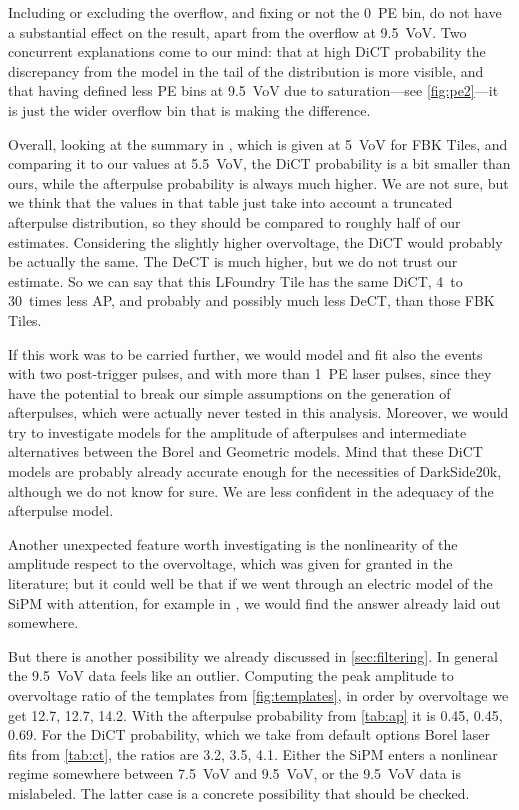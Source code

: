 Including or excluding the overflow, and fixing or not the 0~PE bin, do not
have a substantial effect on the result, apart from the overflow at
\SI{9.5}{VoV}. Two concurrent explanations come to our mind: that at high DiCT
probability the discrepancy from the model in the tail of the distribution is
more visible, and that having defined less PE bins at \SI{9.5}{VoV} due to
saturation---see \autoref{fig:pe2}---it is just the wider overflow bin that is
making the difference.

Overall, looking at the summary in \cite[tab.~3.1~p.~62]{savarese2018}, which
is given at \SI{5}{VoV} for FBK Tiles, and comparing it to our values at
\SI{5.5}{VoV}, the DiCT probability is a bit smaller than ours, while the
afterpulse probability is always much higher. We are not sure, but we think
that the values in that table just take into account a truncated afterpulse
distribution, so they should be compared to roughly half of our estimates.
Considering the slightly higher overvoltage, the DiCT would probably be
actually the same. The DeCT is much higher, but we do not trust our estimate.
So we can say that this LFoundry Tile has the same DiCT, 4~to 30~times less AP,
and probably and possibly much less DeCT, than those FBK Tiles.

If this work was to be carried further, we would model and fit also the events
with two post-trigger pulses, and with more than 1~PE laser pulses, since they
have the potential to break our simple assumptions on the generation of
afterpulses, which were actually never tested in this analysis. Moreover, we
would try to investigate models for the amplitude of afterpulses and
intermediate alternatives between the Borel and Geometric models. Mind that
these DiCT models are probably already accurate enough for the necessities of
DarkSide20k, although we do not know for sure. We are less confident in the
adequacy of the afterpulse model.

Another unexpected feature worth investigating is the nonlinearity of the
amplitude respect to the overvoltage, which was given for granted in the
literature; but it could well be that if we went through an electric model of
the SiPM with attention, for example in \cite[ch.~3]{savarese2018}, we would
find the answer already laid out somewhere.

But there is another possibility we already discussed in
\autoref{sec:filtering}. In general the \SI{9.5}{VoV} data feels like an
outlier. Computing the peak amplitude to overvoltage ratio of the templates
from \autoref{fig:templates}, in order by overvoltage we get 12.7, 12.7, 14.2.
With the afterpulse probability from \autoref{tab:ap} it is 0.45, 0.45, 0.69.
For the DiCT probability, which we take from default options Borel laser fits
from \autoref{tab:ct}, the ratios are 3.2, 3.5, 4.1. Either the SiPM enters a
nonlinear regime somewhere between \SI{7.5}{VoV} and \SI{9.5}{VoV}, or the
\SI{9.5}{VoV} data is mislabeled. The latter case is a concrete possibility
that should be checked.

